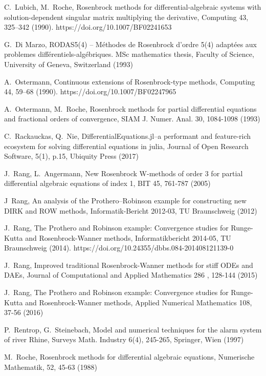 \documentclass{juliacon}
\begin{document}
\begin{thebibliography}{}
 C.~Lubich, M.~Roche, Rosenbrock methods for differential-algebraic systems with solution-dependent singular matrix multiplying the derivative,
Computing 43, 325–342 (1990). https://doi.org/10.1007/BF02241653

 G.~Di Marzo, RODAS5(4) – Méthodes de Rosenbrock d’ordre 5(4) adaptées aux problemes différentiels-algébriques. MSc mathematics thesis, Faculty of Science,
University of Geneva, Switzerland (1993)

 A.~Ostermann, Continuous extensions of Rosenbrock-type methods,  Computing 44, 59–68 (1990). https://doi.org/10.1007/BF02247965

 A.~Ostermann, M.~Roche, Rosenbrock methods for partial differential equations and fractional orders of convergence,
SIAM J. Numer. Anal. 30, 1084-1098 (1993)

 C.~Rackauckas, Q.~Nie, DifferentialEquations.jl--a performant and feature-rich ecosystem for solving differential equations in julia,
Journal of Open Research Software, 5(1), p.15, Ubiquity Press (2017)

 J.~Rang, L.~Angermann,
New Rosenbrock W-methods of order 3 for partial differential algebraic equations of index 1, BIT 45, 761-787 (2005)

 J~Rang, An analysis of the Prothero–Robinson example for constructing new DIRK and ROW methods, Informatik-Bericht 2012-03, TU Braunschweig (2012)

 J.~Rang, The Prothero and Robinson example: 
Convergence studies for Runge-Kutta and Rosenbrock-Wanner methods, 
Informatikbericht 2014-05, TU Braunschweig (2014).  https://doi.org/10.24355/dbbs.084-201408121139-0

 J.~Rang, Improved traditional Rosenbrock-Wanner methods for stiff ODEs and DAEs,
Journal of Computational and Applied Mathematics 286 , 128-144 (2015)

J.~Rang, The Prothero and Robinson example: Convergence studies for Runge-Kutta and Rosenbrock-Wanner methods,
Applied Numerical Mathematics 108, 37-56 (2016)

 P.~Rentrop, G.~Steinebach,
Model and numerical techniques for the alarm system of river Rhine,
Surveys Math. Industry 6(4), 245-265, Springer, Wien (1997)

 M.~Roche, Rosenbrock methods for differential algebraic equations, Numerische Mathematik, 52, 45-63 (1988)


\end{thebibliography}
\end{document}
